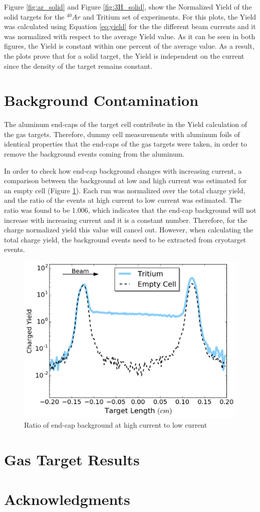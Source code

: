 \documentclass[final,5p,times,twocolumn]{elsarticle}
\begin{document}
Figure \ref{fig:ar_solid} and Figure \ref{fig:3H_solid}, show the Normalized Yield of the solid targets for the $^{40}Ar$ and Tritium set of experiments. For this plots, the Yield was calculated using Equation \ref{eq:yield} for the the different beam currents and it was normalized with respect to the average Yield value. As it can be seen in both figures, the Yield is constant within one percent of the average value. As a result, the plots prove that for a solid target, the Yield is independent on the current since the density of the target remains constant.

\section{Background Contamination}

The aluminum end-caps of the target cell contribute in the Yield calculation of the gas targets. Therefore, dummy cell measurements with aluminum foils of identical properties that the end-caps of the gas targets were taken, in order to remove the background events coming from the aluminum.

In order to check how end-cap background changes with increasing current, a
comparison between the background at low and high current was estimated for
an empty cell (Figure \ref{fig:bk_empty}). Each run was normalized over the total charge yield, and the ratio of the events at high current to low current was estimated. The ratio was found to be 1.006, which indicates that the end-cap background will not increase with increasing current and it is a constant number. Therefore, for the charge normalized yield this value will cancel out. However, when calculating the total charge yield, the background events need to be extracted from cryotarget events.

\begin{figure}[h]
 \centering
 \includegraphics[width=\linewidth]{images/contamination.pdf}
  \caption{Ratio of end-cap background at high current to low current}
  \label{fig:bk_empty}
\end{figure}

 
 
\section{Gas Target Results}


\section{Acknowledgments}

 

\end{document}
